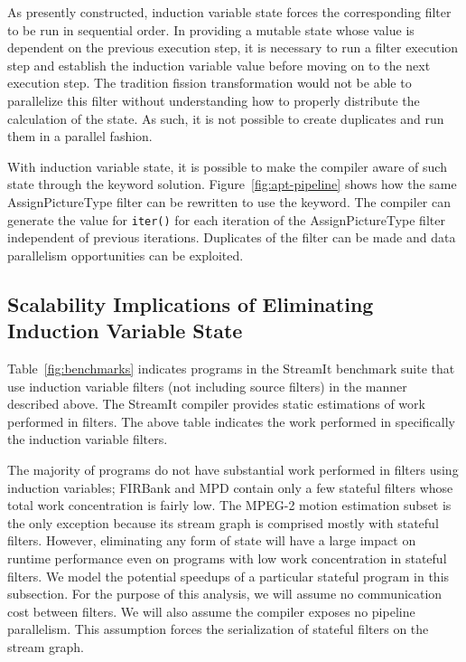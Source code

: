 As presently constructed, induction variable state for\-ces the
corresponding filter to be run in sequential order.  In providing a
mutable state whose value is dependent on the previous execution step,
it is necessary to run a filter execution step and establish the
induction variable value before moving on to the next execution step.
The tradition fission transformation would not be able to parallelize
this filter without understanding how to properly distribute the
calculation of the state.  As such, it is not possible 
to create duplicates and run them in a parallel fashion.  

With induction variable state, it is possible to make the 
compiler aware of such state through the keyword solution.  
Figure~\ref{fig:apt-pipeline} shows how the same AssignPictureType filter can be 
rewritten to use the keyword.  The compiler can generate the value
for {\tt iter()} for each iteration of the AssignPictureType filter independent
of previous iterations.  Duplicates of the filter can be made and
data parallelism opportunities can be exploited.


\subsection{Scalability Implications of Eliminating Induction Variable State}
\label{sec:model-analysis}

Table~\ref{fig:benchmarks} indicates programs in the StreamIt
benchmark suite that use induction variable filters (not including
source filters) in the manner described above.  The StreamIt compiler
provides static estimations of work performed in filters.  The above
table indicates the work performed in specifically the induction
variable filters.

The majority of programs do not have substantial work performed in
filters using induction variables; FIRBank and MPD contain only a few
stateful filters whose total work concentration is fairly low.  The
MPEG-2 motion estimation subset is the only exception because its
stream graph is comprised mostly with stateful filters.  However,
eliminating any form of state will have a large impact on runtime
performance even on programs with low work concentration in stateful
filters.  We model the potential speedups of a particular stateful
program in this subsection.  For the purpose of this analysis, we will
assume no communication cost between filters.  We will also assume the
compiler exposes no pipeline parallelism.  This assumption forces the
serialization of stateful filters on the stream graph.

